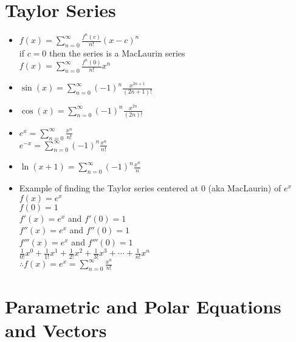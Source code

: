 \documentclass{article}
\begin{document}
\section*{\color{Gray}Taylor Series}
  \begin{multicols}{2}
  \begin{itemize}
    \item \(
      f(x)=\sum\limits_{n=0}^{\infty}\frac{f^n(c)}{n!}(x-c)^n\)\\
      if \(c=0\) then the series is a MacLaurin series\\
      \subitem
      \(f(x)=\sum\limits_{n=0}^{\infty}\frac{f^n(0)}{n!}x^n\)\\
    \item  \(\sin(x)=\sum\limits_{n=0}^{\infty} (-1)^n
      \frac{x^{2n+1}}{(2n+1)!}\)\\
    \item \(\cos(x)=\sum\limits_{n=0}^{\infty}(-1)^n\frac{x^{2n}}{(2n)!}
     \)\\
    \item\( e^x=\sum\limits_{n=0}^{\infty}\frac{x^n}{n!} \)\\
      \subitem \( e^{-x}=\sum\limits_{n=0}^{\infty}(-1)^n
      \frac{x^n}{n!} \)\\
    \item \(\ln(x+1)=\sum\limits_{n=0}^{\infty}(-1)^n\frac{x^n}{n}\)\\
      \columnbreak
    \item Example of finding the Taylor series centered at 0 (aka
      MacLaurin) of \(e^x\)\\
      \subitem \(f(x)=e^x\)\\
      \subitem \(f(0)=1\)\\
      \(f'(x)=e^x\) and \(f'(0)=1\)\\
      \(f''(x)=e^x\) and \(f''(0)=1\)\\
      \(f'''(x)=e^x\) and \(f'''(0)=1\)\\
      \(\frac{1}{0!}x^0+\frac{1}{1!}x^1+\frac{1}{2!}x^2+\frac{1}{3!}x^3+\cdots+\frac{1}{n!}x^n\)\\
      \(\therefore f(x)=e^x=\sum\limits_{n=0}^{\infty}
      \frac{x^n}{n!}\)\\
  \end{itemize}
\end{multicols}
\newpage
\section*{\color{Gray}Parametric and Polar Equations and Vectors}
\end{document}
